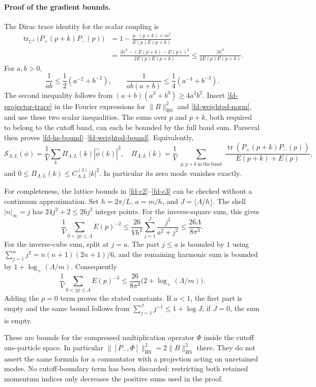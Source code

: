 \paragraph{Proof of the gradient bounds.}
The Dirac trace identity for the scalar coupling is
\begin{align}
 \operatorname{tr}_{\mathbb C^4}
       \bigl(P_+(p+k)P_-(p)\bigr)
 &=1-\frac{p\cdot(p+k)+m^2}{E(p)E(p+k)}\nonumber\\
 &=\frac{|k|^2-(E(p+k)-E(p))^2}{2E(p)E(p+k)}
 \le\frac{|k|^2}{2E(p)E(p+k)}.
 \label{fd-projector-trace}
\end{align}
For $a,b>0$,
\[
 \frac1{ab}\le\frac12(a^{-2}+b^{-2}),\qquad
 \frac1{ab(a+b)}\le\frac14(a^{-3}+b^{-3}).
\]
The second inequality follows from
$(a+b)(a^3+b^3)\ge4a^2b^2$.
Insert \eqref{fd-projector-trace} in the Fourier expressions for
$\|B\|_{\mathrm{HS}}^2$ and \eqref{fd-weighted-norm}, and use these two
scalar inequalities.  The sums over $p$ and $p+k$, both required to belong
to the cutoff band, can each be bounded by the full band sum.  Parseval
then proves \eqref{fd-hs-bound}--\eqref{fd-weighted-bound}.  Equivalently,
\[
 \mathcal S_{\Lambda,L}(\phi)
 =\frac1V\sum_k\Pi_{\Lambda,L}(k)|\widehat\phi(k)|^2,
 \quad
 \Pi_{\Lambda,L}(k)=\frac1V
 \sum_{\substack{p,p+k\ \mathrm{in\ the\ band}}}
 \frac{\operatorname{tr}(P_+(p+k)P_-(p))}{E(p+k)+E(p)},
\]
and $0\le\Pi_{\Lambda,L}(k)\le C^{(3)}_{\Lambda,L}|k|^2$.
In particular its zero mode vanishes exactly.

For completeness, the lattice bounds in
\eqref{fd-c2}--\eqref{fd-c3} can be checked without a continuum
approximation.  Set $h=2\pi/L$, $a=m/h$, and $J=\lfloor\Lambda/h\rfloor$.
The shell $|n|_\infty=j$ has $24j^2+2\le26j^2$ integer points.
For the inverse-square sum, this gives
\[
 \frac1V\sum_{0<|p|\le\Lambda}E(p)^{-2}
 \le\frac{26}{Vh^2}\sum_{j=1}^J\frac{j^2}{a^2+j^2}
 \le\frac{26\Lambda}{8\pi^3}.
\]
For the inverse-cube sum, split at $j=a$.  The part $j\le a$ is bounded
by $1$ using $\sum_{j=1}^n j^2=n(n+1)(2n+1)/6$, and the remaining harmonic
sum is bounded by $1+\log_+(\Lambda/m)$.  Consequently
\[
 \frac1V\sum_{0<|p|\le\Lambda}E(p)^{-3}
 \le\frac{26}{8\pi^3}\bigl(2+\log_+(\Lambda/m)\bigr).
\]
Adding the $p=0$ term proves the stated constants.  If $a<1$, the first
part is empty and the same bound follows from
$\sum_{j=1}^Jj^{-1}\le1+\log J$; if $J=0$, the sum is empty.

These are bounds for the compressed multiplication operator $\Phi$ inside
the cutoff one-particle space.  In particular
$\|[P_-,\Phi]\|_{\mathrm{HS}}^2=2\|B\|_{\mathrm{HS}}^2$ there.
They do not assert the same formula for a commutator with a projection
acting on unretained modes.  No cutoff-boundary term has been discarded:
restricting both retained momentum indices only decreases the positive
sums used in the proof.


